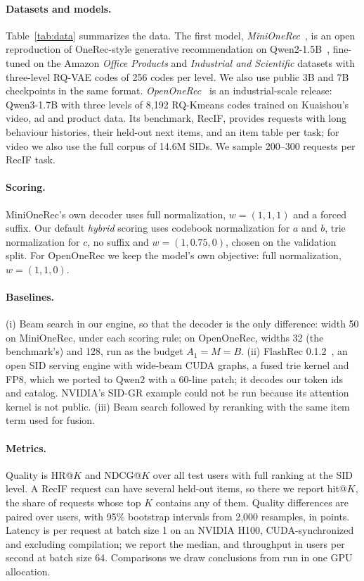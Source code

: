 \documentclass[sigconf,anonymous]{acmart}
\begin{document}
\paragraph{Datasets and models.} Table~\ref{tab:data} summarizes the data. The first model,
\emph{MiniOneRec}~\cite{ax2510.24431}, is an open reproduction of OneRec-style generative recommendation on Qwen2-1.5B~\cite{ax2407.10671}, fine-tuned on
the Amazon \emph{Office Products} and \emph{Industrial and Scientific} datasets with three-level RQ-VAE codes of 256
codes per level. We also use public 3B and 7B checkpoints in the same format. \emph{OpenOneRec}~\cite{ax2512.24762}
is an industrial-scale release: Qwen3-1.7B with three levels of 8,192 RQ-Kmeans codes trained on Kuaishou's video,
ad and product data. Its benchmark, RecIF, provides requests with long behaviour histories, their held-out next
items, and an item table per task; for video we also use the full corpus of 14.6M SIDs. We sample 200--300 requests per
RecIF task.

\paragraph{Scoring.} MiniOneRec's own decoder uses full normalization, $w=(1,1,1)$ and a forced suffix. Our default
\emph{hybrid} scoring uses codebook normalization for $a$ and $b$, trie normalization for $c$, no suffix and
$w=(1,0.75,0)$, chosen on the validation split. For OpenOneRec we keep the model's own objective: full
normalization, $w=(1,1,0)$.

\paragraph{Baselines.} (i) Beam search in our engine, so that the decoder is the only difference: width 50 on
MiniOneRec, under each scoring rule; on OpenOneRec, widths 32 (the benchmark's) and 128, run as the budget
$A_1=M=B$. (ii) FlashRec 0.1.2~\cite{flashrec}, an open SID serving engine with wide-beam CUDA graphs, a fused trie
kernel and FP8, which we ported to Qwen2 with a 60-line patch; it decodes our token ids and catalog. NVIDIA's SID-GR
example could not be run because its attention kernel is not public. (iii) Beam search followed by reranking with
the same item term used for fusion.

\paragraph{Metrics.} Quality is HR@$K$ and NDCG@$K$ over all test users with full ranking at the SID level. A RecIF
request can have several held-out items, so there we report hit@$K$, the share of requests whose top $K$ contains
any of them. Quality differences are paired over users, with 95\% bootstrap intervals from 2,000 resamples, in
points. Latency is per request at batch size 1 on an NVIDIA H100, CUDA-synchronized and excluding compilation; we
report the median, and throughput in users per second at batch size 64. Comparisons we draw conclusions from run
in one GPU allocation.
\end{document}
